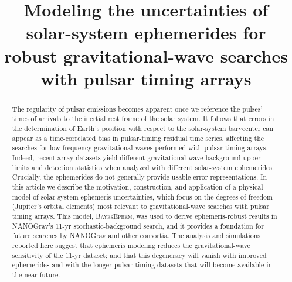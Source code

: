 \documentclass[iop,apj,twocolappendix]{emulateapj}
\begin{document}

\title{Modeling the uncertainties of solar-system ephemerides for robust gravitational-wave searches with pulsar timing arrays}






\begin{abstract}
The regularity of pulsar emissions becomes apparent once we reference the pulses' times of arrivals to the inertial rest frame of the solar system. It follows that errors in the determination of Earth's position with respect to the solar-system barycenter can appear as a time-correlated bias in pulsar-timing residual time series, affecting the searches for low-frequency gravitational waves performed with pulsar-timing arrays.
Indeed, recent array datasets yield different gravitational-wave background upper limits and detection statistics when analyzed with different solar-system ephemerides. Crucially, the ephemerides do not generally provide usable error representations.
In this article we describe the motivation, construction, and application of a physical model of solar-system ephemeris uncertainties, which focus on the degrees of freedom (Jupiter's orbital elements) most relevant to gravitational-wave searches with pulsar timing arrays.
This model, \textsc{BayesEphem}, was used to derive ephemeris-robust results in NANOGrav's 11-yr stochastic-background search, and it provides a foundation for future searches by NANOGrav and other consortia.
The analysis and simulations reported here suggest that ephemeris modeling reduces the gravitational-wave sensitivity of the 11-yr dataset; and that this degeneracy will vanish with improved ephemerides and with the longer pulsar-timing datasets that will become available in the near future.
\end{abstract}


\maketitle
\end{document}
